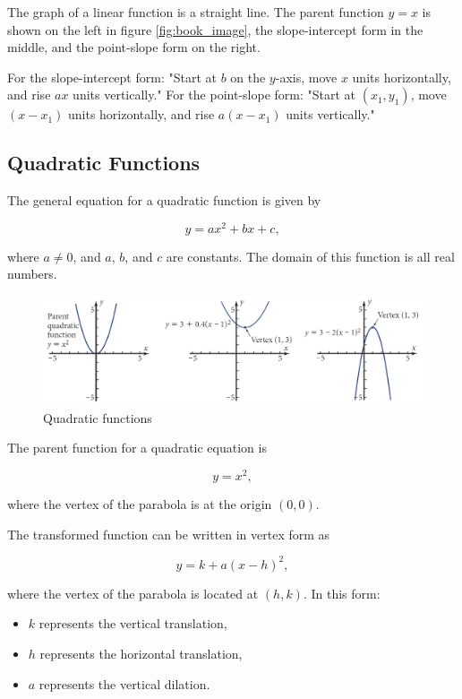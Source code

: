 The graph of a linear function is a straight line. The parent function \(y = x\) is shown on the left in figure \ref{fig:book_image}, the slope-intercept form in the middle, and the point-slope form on the right.

For the slope-intercept form: "Start at \(b\) on the \(y\)-axis, move \(x\) units horizontally, and rise \(ax\) units vertically." For the point-slope form: "Start at \((x_1, y_1)\), move \((x - x_1)\) units horizontally, and rise \(a(x - x_1)\) units vertically."

\subsection*{Quadratic Functions}
The general equation for a quadratic function is given by

\[
y = ax^2 + bx + c,
\]

where \(a \neq 0\), and \(a\), \(b\), and \(c\) are constants. The domain of this function is all real numbers.

\begin{figure}[h]
    \centering
    \includegraphics[width=1\textwidth]{figure/book2.png} %
    \caption{Quadratic functions}
    \label{fig:book_image2}
\end{figure}

The parent function for a quadratic equation is

\[
y = x^2,
\]

where the vertex of the parabola is at the origin \((0, 0)\).

The transformed function can be written in vertex form as

\[
y = k + a(x-h)^2,
\]

where the vertex of the parabola is located at \((h, k)\). In this form:
\begin{itemize}
    \item \(k\) represents the vertical translation,
    \item \(h\) represents the horizontal translation,
    \item \(a\) represents the vertical dilation.
\end{itemize}

